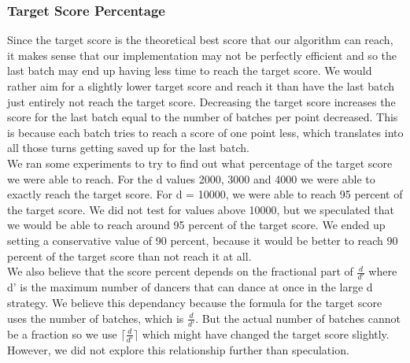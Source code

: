 \subsubsection{Target Score Percentage}
Since the target score is the theoretical best score that our algorithm can reach, it makes sense that our implementation may not be perfectly efficient and so the last batch may end up having less time to reach the target score.
We would rather aim for a slightly lower target score and reach it than have the last batch just entirely not reach the target score.  Decreasing the target score increases the score for the last batch equal to the number of batches per point decreased. This is because each batch tries to reach a score of one point less, which translates into all those turns getting saved up for the last batch.\\
We ran some experiments to try to find out what percentage of the target score we were able to reach. For the d values 2000, 3000 and 4000 we were able to exactly reach the target score. For d = 10000, we were able to reach 95 percent of the target score. We did not test for values above 10000, but we speculated that we would be able to reach around 95 percent of the target score. We ended up setting a conservative value of 90 percent, because it would be better to reach 90 percent of the target score than not reach it at all.\\
We also believe that the score percent depends on the fractional part of $\frac{d}{d'}$ where d' is the maximum number of dancers that can dance at once in the large d strategy. We believe this dependancy because the formula for the target score uses the number of batches, which is $\frac{d}{d'}$. But the actual number of batches cannot be a fraction so we use $\lceil\frac{d}{d'}\rceil$ which might have changed the target score slightly. However, we did not explore this relationship further than speculation.
